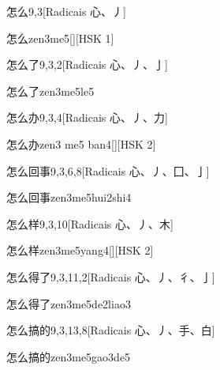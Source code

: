\begin{entry}{怎么}{9,3}[Radicais ⼼、⼃]
  \begin{phonetics}{怎么}{zen3me5}[][HSK 1]
  \end{phonetics}
\end{entry}

\begin{entry}{怎么了}{9,3,2}[Radicais ⼼、⼃、⼅]
  \begin{phonetics}{怎么了}{zen3me5le5}
  \end{phonetics}
\end{entry}

\begin{entry}{怎么办}{9,3,4}[Radicais ⼼、⼃、⼒]
  \begin{phonetics}{怎么办}{zen3 me5 ban4}[][HSK 2]
  \end{phonetics}
\end{entry}

\begin{entry}{怎么回事}{9,3,6,8}[Radicais ⼼、⼃、⼞、⼅]
  \begin{phonetics}{怎么回事}{zen3me5hui2shi4}
  \end{phonetics}
\end{entry}

\begin{entry}{怎么样}{9,3,10}[Radicais ⼼、⼃、⽊]
  \begin{phonetics}{怎么样}{zen3me5yang4}[][HSK 2]
  \end{phonetics}
\end{entry}

\begin{entry}{怎么得了}{9,3,11,2}[Radicais ⼼、⼃、⼻、⼅]
  \begin{phonetics}{怎么得了}{zen3me5de2liao3}
  \end{phonetics}
\end{entry}

\begin{entry}{怎么搞的}{9,3,13,8}[Radicais ⼼、⼃、⼿、⽩]
  \begin{phonetics}{怎么搞的}{zen3me5gao3de5}
  \end{phonetics}
\end{entry}


